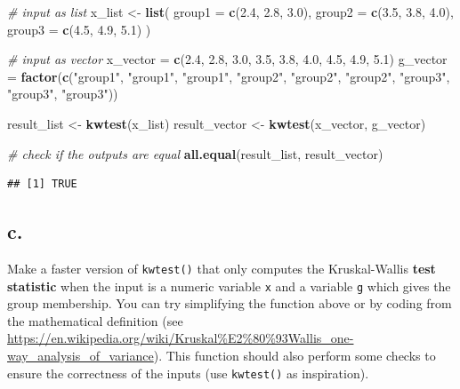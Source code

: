 \documentclass[
]{article}
\newenvironment{Shaded}{\begin{snugshade}}{\end{snugshade}}
\newcommand{\AttributeTok}[1]{\textcolor[rgb]{0.13,0.29,0.53}{#1}}
\newcommand{\CommentTok}[1]{\textcolor[rgb]{0.56,0.35,0.01}{\textit{#1}}}
\newcommand{\FloatTok}[1]{\textcolor[rgb]{0.00,0.00,0.81}{#1}}
\newcommand{\FunctionTok}[1]{\textcolor[rgb]{0.13,0.29,0.53}{\textbf{#1}}}
\newcommand{\NormalTok}[1]{#1}
\newcommand{\OtherTok}[1]{\textcolor[rgb]{0.56,0.35,0.01}{#1}}
\newcommand{\StringTok}[1]{\textcolor[rgb]{0.31,0.60,0.02}{#1}}
\begin{document}
\begin{Shaded}
\begin{Highlighting}[]
\CommentTok{\# input as list}
\NormalTok{x\_list }\OtherTok{\textless{}{-}} \FunctionTok{list}\NormalTok{(}
  \AttributeTok{group1 =} \FunctionTok{c}\NormalTok{(}\FloatTok{2.4}\NormalTok{, }\FloatTok{2.8}\NormalTok{, }\FloatTok{3.0}\NormalTok{),}
  \AttributeTok{group2 =} \FunctionTok{c}\NormalTok{(}\FloatTok{3.5}\NormalTok{, }\FloatTok{3.8}\NormalTok{, }\FloatTok{4.0}\NormalTok{),}
  \AttributeTok{group3 =} \FunctionTok{c}\NormalTok{(}\FloatTok{4.5}\NormalTok{, }\FloatTok{4.9}\NormalTok{, }\FloatTok{5.1}\NormalTok{)}
\NormalTok{)}

\CommentTok{\# input as vector}
\NormalTok{x\_vector }\OtherTok{=} \FunctionTok{c}\NormalTok{(}\FloatTok{2.4}\NormalTok{, }\FloatTok{2.8}\NormalTok{, }\FloatTok{3.0}\NormalTok{, }\FloatTok{3.5}\NormalTok{, }\FloatTok{3.8}\NormalTok{, }\FloatTok{4.0}\NormalTok{, }\FloatTok{4.5}\NormalTok{, }\FloatTok{4.9}\NormalTok{, }\FloatTok{5.1}\NormalTok{)}
\NormalTok{g\_vector }\OtherTok{=} \FunctionTok{factor}\NormalTok{(}\FunctionTok{c}\NormalTok{(}\StringTok{"group1"}\NormalTok{, }\StringTok{"group1"}\NormalTok{, }\StringTok{"group1"}\NormalTok{,}
                    \StringTok{"group2"}\NormalTok{, }\StringTok{"group2"}\NormalTok{, }\StringTok{"group2"}\NormalTok{,}
                    \StringTok{"group3"}\NormalTok{, }\StringTok{"group3"}\NormalTok{, }\StringTok{"group3"}\NormalTok{))}

\NormalTok{result\_list }\OtherTok{\textless{}{-}} \FunctionTok{kwtest}\NormalTok{(x\_list)}
\NormalTok{result\_vector }\OtherTok{\textless{}{-}} \FunctionTok{kwtest}\NormalTok{(x\_vector, g\_vector)}

\CommentTok{\# check if the outputs are equal}
\FunctionTok{all.equal}\NormalTok{(result\_list, result\_vector)}
\end{Highlighting}
\end{Shaded}

\begin{verbatim}
## [1] TRUE
\end{verbatim}

\subsection{c.}\label{c.-5}

Make a faster version of \texttt{kwtest()} that only computes the
Kruskal-Wallis \textbf{test statistic} when the input is a numeric
variable \texttt{x} and a variable \texttt{g} which gives the group
membership. You can try simplifying the function above or by coding from
the mathematical definition (see
\url{https://en.wikipedia.org/wiki/Kruskal\%E2\%80\%93Wallis_one-way_analysis_of_variance}).
This function should also perform some checks to ensure the correctness
of the inputs (use \texttt{kwtest()} as inspiration).
\end{document}
